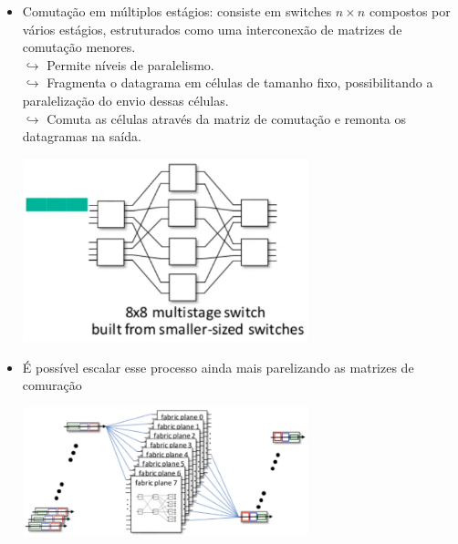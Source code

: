 \begin{itemize}[left=0.5cm, align=left, nosep]
                \item Comutação em múltiplos estágios: consiste em switches \(n \times n\) compostos por vários estágios, estruturados como uma interconexão de matrizes de comutação menores. \\
                    $\hookrightarrow$ Permite níveis de paralelismo. \\
                    $\hookrightarrow$ Fragmenta o datagrama em células de tamanho fixo, possibilitando a paralelização do envio dessas células. \\
                    $\hookrightarrow$ Comuta as células através da matriz de comutação e remonta os datagramas na saída.
                
                    \begin{center}
                        \includegraphics[width=0.65\textwidth]{img/cap-04/comutacao-em-multiplos-estagios.png}
                    \end{center}

                \item É possível escalar esse processo ainda mais parelizando as matrizes de comuração
                
                    \begin{center}
                        \includegraphics[width=0.65\textwidth]{img/cap-04/multiplos-estagios-escalavel.png}
                    \end{center}
            
            \end{itemize}

